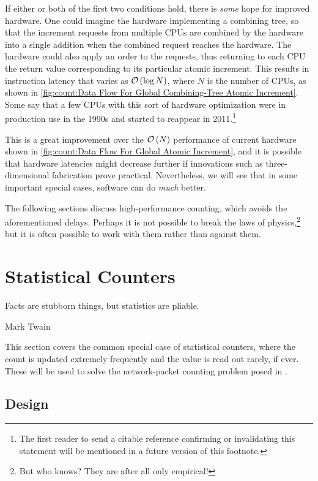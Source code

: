 {	If either or both of the first two conditions hold, there is
	\emph{some} hope for improved hardware.
	One could imagine the hardware implementing a combining tree,
	so that the increment requests from multiple CPUs are combined
	by the hardware into a single addition when the combined request
	reaches the hardware.
	The hardware could also apply an order to the requests, thus
	returning to each CPU the return value corresponding to its
	particular atomic increment.
	This results in instruction latency that varies as $\mathcal{O}\left(\log N\right)$,
	where $N$ is the number of CPUs, as shown in
	\cref{fig:count:Data Flow For Global Combining-Tree Atomic Increment}.
	Some say that a few CPUs with this sort of hardware optimization
	were in production use in the 1990s and started to reappear in
	2011.\footnote{
		The first reader to send a citable reference confirming
		or invalidating this statement will be mentioned in a
		future version of this footnote.}

	This is a great improvement over the $\mathcal{O}\left(N\right)$ performance
	of current hardware shown in
	\cref{fig:count:Data Flow For Global Atomic Increment},
	and it is possible that hardware latencies might decrease
	further if innovations such as three-dimensional fabrication prove
	practical.
	Nevertheless, we will see that in some important special cases,
	software can do \emph{much} better.
}\QuickQuizEnd

The following sections discuss high-performance counting, which
avoids the aforementioned delays.
Perhaps it is not possible to break the laws of physics,\footnote{
	But who knows?
	They are after all only empirical!}
but it is often possible to work with them rather than against them.

\section{Statistical Counters}
\label{sec:count:Statistical Counters}
%
\epigraph{Facts are stubborn things, but statistics are pliable.}
	 {Mark Twain}

This section covers the common special case of statistical counters, where
the count is updated extremely frequently and the value is read out
rarely, if ever.
These will be used to solve the network-packet counting problem
posed in \QuickQuizRef{\QcountQstatcnt}.

\subsection{Design}

